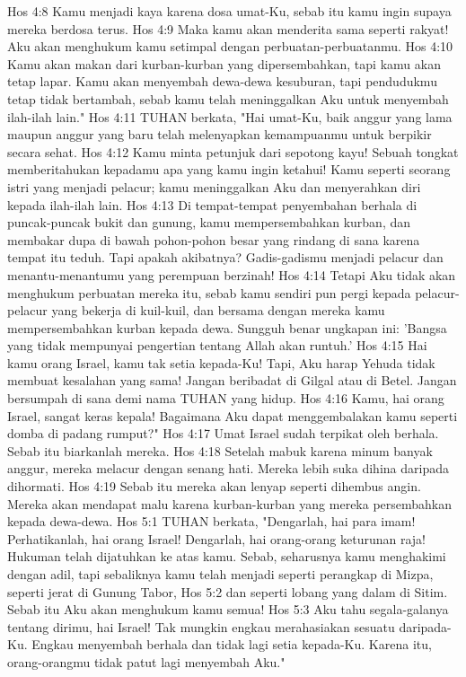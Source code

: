 Hos 4:8  Kamu menjadi kaya karena dosa umat-Ku, sebab itu kamu ingin supaya mereka berdosa terus.
Hos 4:9  Maka kamu akan menderita sama seperti rakyat! Aku akan menghukum kamu setimpal dengan perbuatan-perbuatanmu.
Hos 4:10  Kamu akan makan dari kurban-kurban yang dipersembahkan, tapi kamu akan tetap lapar. Kamu akan menyembah dewa-dewa kesuburan, tapi pendudukmu tetap tidak bertambah, sebab kamu telah meninggalkan Aku untuk menyembah ilah-ilah lain."
Hos 4:11  TUHAN berkata, "Hai umat-Ku, baik anggur yang lama maupun anggur yang baru telah melenyapkan kemampuanmu untuk berpikir secara sehat.
Hos 4:12  Kamu minta petunjuk dari sepotong kayu! Sebuah tongkat memberitahukan kepadamu apa yang kamu ingin ketahui! Kamu seperti seorang istri yang menjadi pelacur; kamu meninggalkan Aku dan menyerahkan diri kepada ilah-ilah lain.
Hos 4:13  Di tempat-tempat penyembahan berhala di puncak-puncak bukit dan gunung, kamu mempersembahkan kurban, dan membakar dupa di bawah pohon-pohon besar yang rindang di sana karena tempat itu teduh. Tapi apakah akibatnya? Gadis-gadismu menjadi pelacur dan menantu-menantumu yang perempuan berzinah!
Hos 4:14  Tetapi Aku tidak akan menghukum perbuatan mereka itu, sebab kamu sendiri pun pergi kepada pelacur-pelacur yang bekerja di kuil-kuil, dan bersama dengan mereka kamu mempersembahkan kurban kepada dewa. Sungguh benar ungkapan ini: 'Bangsa yang tidak mempunyai pengertian tentang Allah akan runtuh.'
Hos 4:15  Hai kamu orang Israel, kamu tak setia kepada-Ku! Tapi, Aku harap Yehuda tidak membuat kesalahan yang sama! Jangan beribadat di Gilgal atau di Betel. Jangan bersumpah di sana demi nama TUHAN yang hidup.
Hos 4:16  Kamu, hai orang Israel, sangat keras kepala! Bagaimana Aku dapat menggembalakan kamu seperti domba di padang rumput?"
Hos 4:17  Umat Israel sudah terpikat oleh berhala. Sebab itu biarkanlah mereka.
Hos 4:18  Setelah mabuk karena minum banyak anggur, mereka melacur dengan senang hati. Mereka lebih suka dihina daripada dihormati.
Hos 4:19  Sebab itu mereka akan lenyap seperti dihembus angin. Mereka akan mendapat malu karena kurban-kurban yang mereka persembahkan kepada dewa-dewa.
Hos 5:1  TUHAN berkata, "Dengarlah, hai para imam! Perhatikanlah, hai orang Israel! Dengarlah, hai orang-orang keturunan raja! Hukuman telah dijatuhkan ke atas kamu. Sebab, seharusnya kamu menghakimi dengan adil, tapi sebaliknya kamu telah menjadi seperti perangkap di Mizpa, seperti jerat di Gunung Tabor,
Hos 5:2  dan seperti lobang yang dalam di Sitim. Sebab itu Aku akan menghukum kamu semua!
Hos 5:3  Aku tahu segala-galanya tentang dirimu, hai Israel! Tak mungkin engkau merahasiakan sesuatu daripada-Ku. Engkau menyembah berhala dan tidak lagi setia kepada-Ku. Karena itu, orang-orangmu tidak patut lagi menyembah Aku."
